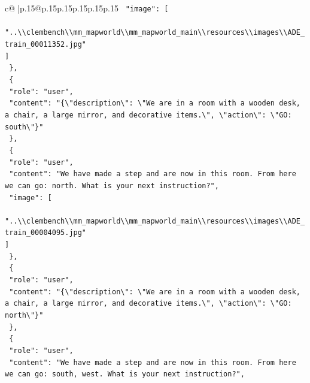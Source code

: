 \documentclass{article}
\begin{document}
{\begin{supertabular}{c@{$\;$}|p{.15\linewidth}@{}p{.15\linewidth}p{.15\linewidth}p{.15\linewidth}p{.15\linewidth}p{.15\linewidth}}
{{{\texttt{    "image": {[}} \\
\texttt{      "..\textbackslash{}\textbackslash{}clembench\textbackslash{}\textbackslash{}mm\_mapworld\textbackslash{}\textbackslash{}mm\_mapworld\_main\textbackslash{}\textbackslash{}resources\textbackslash{}\textbackslash{}images\textbackslash{}\textbackslash{}ADE\_train\_00011352.jpg"} \\
\texttt{    {]}} \\
\texttt{  \},} \\
\texttt{  \{} \\
\texttt{    "role": "user",} \\
\texttt{    "content": "\{\textbackslash{}"description\textbackslash{}": \textbackslash{}"We are in a room with a wooden desk, a chair, a large mirror, and decorative items.\textbackslash{}", \textbackslash{}"action\textbackslash{}": \textbackslash{}"GO: south\textbackslash{}"\}"} \\
\texttt{  \},} \\
\texttt{  \{} \\
\texttt{    "role": "user",} \\
\texttt{    "content": "We have made a step and are now in this room. From here we can go: north. What is your next instruction?",} \\
\texttt{    "image": {[}} \\
\texttt{      "..\textbackslash{}\textbackslash{}clembench\textbackslash{}\textbackslash{}mm\_mapworld\textbackslash{}\textbackslash{}mm\_mapworld\_main\textbackslash{}\textbackslash{}resources\textbackslash{}\textbackslash{}images\textbackslash{}\textbackslash{}ADE\_train\_00004095.jpg"} \\
\texttt{    {]}} \\
\texttt{  \},} \\
\texttt{  \{} \\
\texttt{    "role": "user",} \\
\texttt{    "content": "\{\textbackslash{}"description\textbackslash{}": \textbackslash{}"We are in a room with a wooden desk, a chair, a large mirror, and decorative items.\textbackslash{}", \textbackslash{}"action\textbackslash{}": \textbackslash{}"GO: north\textbackslash{}"\}"} \\
\texttt{  \},} \\
\texttt{  \{} \\
\texttt{    "role": "user",} \\
\texttt{    "content": "We have made a step and are now in this room. From here we can go: south, west. What is your next instruction?",} \\
}}}
\end{supertabular}}
\end{document}
